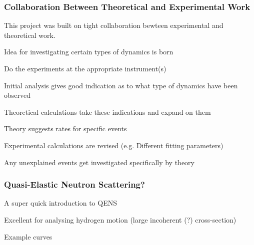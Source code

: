\subsubsection{Collaboration Between Theoretical and Experimental Work}
\label{sec:cooperation}

This project was built on tight collaboration bewteen experimental and theoretical work.
\bit
\item Idea for investigating certain types of dynamics is born
\item Do the experiments at the appropriate instrument(s)
\item Initial analysis gives good indication as to what type of dynamics have been observed
\item Theoretical calculations take these indications and expand on them
\item Theory suggests rates for specific events
\item Experimental calculations are revised (e.g. Different fitting parameters)
\item Any unexplained events get investigated specifically by theory
\eit

\placeholder

\subsubsection{Quasi-Elastic Neutron Scattering?}
\label{sec:qens}
\bit
\item A super quick introduction to QENS
\item Excellent for analysing hydrogen motion (large incoherent (?) cross-section)
\item Example curves
\eit


\placeholder
